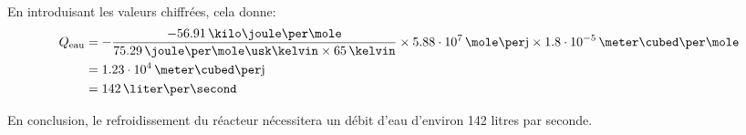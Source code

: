 \documentclass[a4paper,12pt]{article}
\begin{document}
En introduisant les valeurs chiffrées, cela donne:
\begin{align*}
    Q\ind{eau} &=
    -\frac{-56.91\,\kilo\joule\per\mole}{75.29\,\joule\per\mole\usk\kelvin
    \times 65\,\kelvin} \times 5.88\cdot10^7\,\mole\per\mbox{j}
    \times 1.8\cdot10^{-5}\,\meter\cubed\per\mole \\
    &= 1.23\cdot10^4\,\meter\cubed\per\mbox{j} \\
    &= 142\,\liter\per\second \\
\end{align*}

En conclusion, le refroidissement du réacteur nécessitera un débit d'eau
d'environ 142 litres par seconde.
\end{document}
